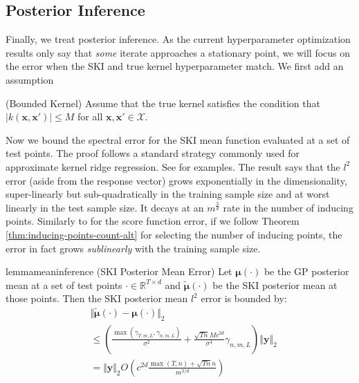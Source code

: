 \subsection{Posterior Inference}\label{sec:posterior-inference}
Finally, we treat posterior inference. As the current hyperparameter optimization results only say that \textit{some} iterate approaches a stationary point, we will focus on the error when the SKI and true kernel hyperparameter match.  We first add an assumption
\begin{assumption}
    (Bounded Kernel) Assume that the true kernel satisfies the condition that $|k(\mathbf{x}, \mathbf{x}')| \leq M$ for all $\mathbf{x}, \mathbf{x}'\in \mathcal{X}$.
\end{assumption}


Now we bound the spectral error for the SKI mean function evaluated at a set of test points. The proof follows a standard strategy commonly used for approximate kernel ridge regression. See \cite{bach2013sharp,musco2017recursive} for examples. The result says that the $l^2$ error (aside from the response vector) grows exponentially in the dimensionality, super-linearly but sub-quadratically in the training sample size and at worst linearly in the test sample size. It decays at an $m^{\frac{3}{d}}$ rate in the number of inducing points. Similarly to for the score function error, if we follow Theorem \ref{thm:inducing-points-count-alt} for selecting the number of inducing points, the error in fact grows \textit{sublinearly} with the training sample size.
\begin{restatable}{lemma}{meaninference}\label{lemma:mean-inference} (SKI Posterior Mean Error)
    Let $\boldsymbol{\mu}(\cdot)$ be the GP posterior mean at a set of test points $\cdot\in \mathbb{R}^{T\times d}$ and $\tilde{\boldsymbol{\mu}}(\cdot)$ be the SKI posterior mean at those points. Then the SKI posterior mean $l^2$ error is bounded by:
{\footnotesize
\begin{align*}
    &\Vert \tilde{\boldsymbol{\mu}}(\cdot)- \boldsymbol{\mu}(\cdot)\Vert_2\\
    &\leq\left(\frac{\max(\gamma_{T,m,L},\gamma_{n,m,L})}{\sigma^2}+\frac{\sqrt{Tn}Mc^{2d}}{\sigma^4}\gamma_{n,m,L}\right)\Vert \textbf{y}\Vert_2\\
    &=\Vert \textbf{y}\Vert_2O\left(c^{2d}\frac{\max(T,n)+\sqrt{Tn}n}{m^{3/d}}\right)
\end{align*}
}
\end{restatable}


